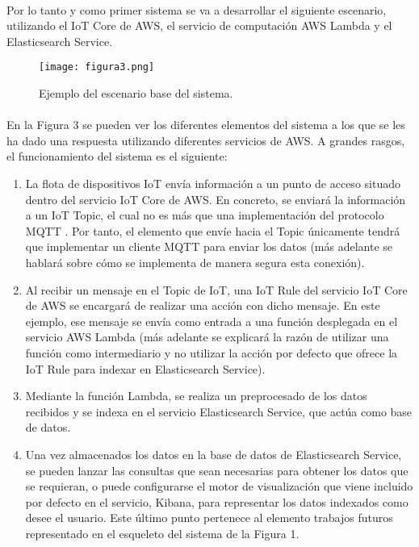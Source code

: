 \documentclass[../../memoria.tex]{subfiles}
\begin{document}
\paragraph{}
Por lo tanto y como primer sistema se va a desarrollar el siguiente escenario, utilizando el IoT Core de AWS, el servicio de computación AWS Lambda y el Elasticsearch Service.

\begin{figure}[H]
    \centering
    \texttt{[image: figura3.png]}
    \caption{Ejemplo del escenario base del sistema.}
    \label{fig:figura3}
\end{figure}

\paragraph{}
En la Figura 3 se pueden ver los diferentes elementos del sistema a los que se les ha dado una respuesta utilizando diferentes servicios de AWS. A grandes rasgos, el funcionamiento del sistema es el siguiente:

\begin{enumerate}
    \item La flota de dispositivos IoT envía información a un punto de acceso situado dentro del servicio IoT Core de AWS. En concreto, se enviará la información a un IoT Topic, el cual no es más que una implementación del protocolo MQTT \cite{mqtt}. Por tanto, el elemento que envíe hacia el Topic únicamente tendrá que implementar un cliente MQTT para enviar los datos (más adelante se hablará sobre cómo se implementa de manera segura esta conexión).

    \item Al recibir un mensaje en el Topic de IoT, una IoT Rule del servicio IoT Core de AWS se encargará de realizar una acción con dicho mensaje. En este ejemplo, ese mensaje se envía como entrada a una función desplegada en el servicio AWS Lambda (más adelante se explicará la razón de utilizar una función como intermediario y no utilizar la acción por defecto que ofrece la IoT Rule para indexar en Elasticsearch Service).

    \item Mediante la función Lambda, se realiza un preprocesado de los datos recibidos y se indexa en el servicio Elasticsearch Service, que actúa como base de datos.

    \item Una vez almacenados los datos en la base de datos de Elasticsearch Service, se pueden lanzar las consultas que sean necesarias para obtener los datos que se requieran, o puede configurarse el motor de visualización que viene incluido por defecto en el servicio, Kibana, para representar los datos indexados como desee el usuario. Este último punto pertenece al elemento trabajos futuros representado en el esqueleto del sistema de la Figura 1.
\end{enumerate}
\end{document}
